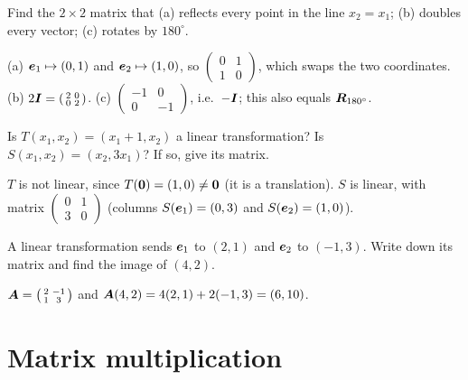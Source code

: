 \begin{exercise}
Find the $2\times2$ matrix that (a) reflects every point in the line $x_2 =
x_1$; (b) doubles every vector; (c) rotates by $180^\circ$.
\end{exercise}
\begin{solution}
(a) $\bm{e}_1 \mapsto (0,1)$ and $\bm{e}_2 \mapsto (1, 0)$, so
$\left(\begin{smallmatrix} 0 & 1\\ 1 & 0\end{smallmatrix}\right)$, which swaps
the two coordinates. (b) $2\bm{I} = \left(\begin{smallmatrix} 2 & 0\\ 0 &
2\end{smallmatrix}\right)$. (c) $\left(\begin{smallmatrix} -1 & 0\\ 0 &
-1\end{smallmatrix}\right)$, i.e.\ $-\bm{I}$; this also equals $\bm{R}_{180^\circ}$.
\end{solution}

\begin{exercise}
Is $T(x_1, x_2) = (x_1 + 1, x_2)$ a linear transformation? Is
$S(x_1, x_2) = (x_2, 3x_1)$? If so, give its matrix.
\end{exercise}
\begin{solution}
$T$ is not linear, since $T(\bm{0}) = (1, 0) \neq \bm{0}$ (it is a
translation). $S$ is linear, with matrix $\left(\begin{smallmatrix} 0 & 1\\ 3 &
0\end{smallmatrix}\right)$ (columns $S(\bm{e}_1) = (0, 3)$ and
$S(\bm{e}_2) = (1, 0)$).
\end{solution}

\begin{exercise}
A linear transformation sends $\bm{e}_1$ to $(2, 1)$ and $\bm{e}_2$ to $(-1, 3)$.
Write down its matrix and find the image of $(4, 2)$.
\end{exercise}
\begin{solution}
$\bm{A} = \left(\begin{smallmatrix} 2 & -1\\ 1 & 3\end{smallmatrix}\right)$ and
$\bm{A}(4, 2) = 4(2, 1) + 2(-1, 3) = (6, 10)$.
\end{solution}

\section{Matrix multiplication}\label{sec:matrix-multiplication}

